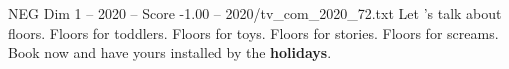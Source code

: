 \begin{textsample}{NEG Dim 1 – 2020 – Score -1.00 – 2020/tv\_com\_2020\_72.txt}  \label{ex:f1_neg_011}
Let 's talk about floors.
Floors for toddlers.
Floors for toys.
Floors for stories.
Floors for screams.
Book now and have yours installed by the \textbf{holidays}.

\end{textsample}
